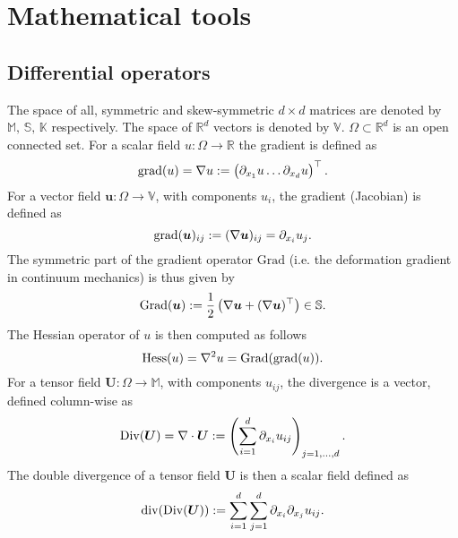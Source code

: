 \chapter{Mathematical tools}
\label{app:math}

\section{Differential operators}

The space of all, symmetric and skew-symmetric $d\times d$ matrices are denoted by $\mathbb{M},\, \mathbb{S},\, \mathbb{K}$ respectively. The space of $\mathbb{R}^d$ vectors is denoted by $\mathbb{V}$. $\Omega \subset \mathbb{R}^d$ is an open connected set. For a scalar field $u: \Omega \rightarrow \mathbb{R}$ the gradient is defined as 
\begin{equation*}
\operatorname*{grad}(u) =  \nabla u := \begin{pmatrix}
\partial_{x_1} u \dots \partial_{x_d} u \\
\end{pmatrix}^\top.
\end{equation*}
For a vector field $\bm{u}: \Omega \rightarrow \mathbb{V}$, with components $u_i$, the gradient (Jacobian) is defined as
\begin{equation*}
\operatorname*{grad}(\bm{u})_{i j}:= (\nabla \bm{u})_{ij} = \partial_{x_i} u_j.
\end{equation*}
The symmetric part of the gradient operator $\mathrm{Grad}$ (i.e. the deformation gradient in continuum mechanics) is thus given by
\begin{equation*}
\operatorname*{Grad}(\bm{u}) := \frac{1}{2} \left(\nabla \bm{u} + (\nabla\bm{u})^\top \right) \in \mathbb{S}.
\end{equation*}
The Hessian operator of $u$ is then computed as follows
\begin{equation*}
\operatorname*{Hess}(u) = \nabla^2 u = \operatorname*{Grad}(\operatorname*{grad}(u)).
\end{equation*}
For a tensor field $\bm{U}: \Omega \rightarrow \mathbb{M}$, with components $u_{ij}$, the divergence is a vector, defined column-wise as
\begin{equation*}
\operatorname*{Div}(\bm U) = \nabla \cdot \bm{U} := \left( \sum_{i = 1}^d \partial_{x_i} u_{ij} \right)_{j = 1, \dots, d}.
\end{equation*}
The double divergence of a tensor field $\bm{U}$ is then a scalar field defined as
\begin{equation*}
\operatorname{div}(\operatorname*{Div}(\bm U)):= \sum_{i = 1}^d \sum_{j = 1}^d \partial_{x_i} \partial_{x_j} u_{ij}.
\end{equation*}

